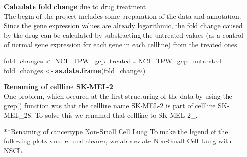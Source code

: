 \documentclass[]{article}
\newenvironment{Shaded}{\begin{snugshade}}{\end{snugshade}}
\newcommand{\CommentTok}[1]{\textcolor[rgb]{0.56,0.35,0.01}{\textit{#1}}}
\newcommand{\DecValTok}[1]{\textcolor[rgb]{0.00,0.00,0.81}{#1}}
\newcommand{\KeywordTok}[1]{\textcolor[rgb]{0.13,0.29,0.53}{\textbf{#1}}}
\newcommand{\NormalTok}[1]{#1}
\newcommand{\OperatorTok}[1]{\textcolor[rgb]{0.81,0.36,0.00}{\textbf{#1}}}
\newcommand{\StringTok}[1]{\textcolor[rgb]{0.31,0.60,0.02}{#1}}
\begin{document}
\textbf{Calculate fold change} due to drug treatment\\
The begin of the project includes some preparation of the data and
annotation. Since the gene expression values are already logarithmic,
the fold change caused by the drug can be calculated by substracting the
untreated values (as a control of normal gene expression for each gene
in each cellline) from the treated ones.

\begin{Shaded}
\begin{Highlighting}[]
\NormalTok{fold_changes <-}\StringTok{ }\NormalTok{NCI_TPW_gep_treated }\OperatorTok{-}\StringTok{ }\NormalTok{NCI_TPW_gep_untreated}
\NormalTok{fold_changes <-}\StringTok{ }\KeywordTok{as.data.frame}\NormalTok{(fold_changes)}
\end{Highlighting}
\end{Shaded}

\textbf{Renaming of cellline SK-MEL-2}\\
One problem, which occured at the first structuring of the data by using
the grep() function was that the cellline name SK-MEL-2 is part of
cellline SK-MEL\_28. To solve this we renamed that cellline to
SK-MEL-2\_.

\begin{Shaded}
\end{Shaded}

**Renaming of cancertype Non-Small Cell Lung To make the legend of the
following plots smaller and clearer, we abbreviate Non-Small Cell Lung
with NSCL.
\end{document}
